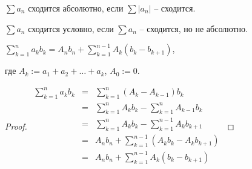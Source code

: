 
\begin{definition} \thmslashn 

    $\sum a_n$ сходится абсолютно, если $\sum |a_n|$ -- сходится.
    
    $\sum a_n$ сходится условно, если $\sum a_n$ -- сходится, но не абсолютно.
    
\end{definition}

\begin{theorem} \thmslashn 

	$\sum\limits_{k=1}^{n} a_kb_k = A_nb_n + \sum\limits_{k=1}^{n-1} A_k(b_k - b_{k+1})$,
	
	где $A_k := a_1 + a_2 + \dotsc + a_k$, $A_0 := 0$.
	
	\begin{proof} \thmslashn
    
        $\begin{array}{rcll}
    	\sum\limits_{k=1}^{n} a_kb_k &=& \sum\limits_{k=1}^{n} (A_k - A_{k-1})b_k \\
    	                             &=& \sum\limits_{k=1}^{n} A_kb_k - \sum\limits_{k=1}^{n} A_{k-1}b_k \\
    	                             &=& \sum\limits_{k=1}^{n} A_kb_k - \sum\limits_{k=1}^{n-1} A_kb_{k+1} \\
    	                             &=& A_nb_n + \sum\limits_{k=1}^{n-1} (A_kb_k - A_kb_{k+1}) \\
    	                             &=& A_nb_n + \sum\limits_{k=1}^{n-1} A_k(b_k - b_{k+1}) \\
    	\end{array}$

    \end{proof}

\end{theorem}

